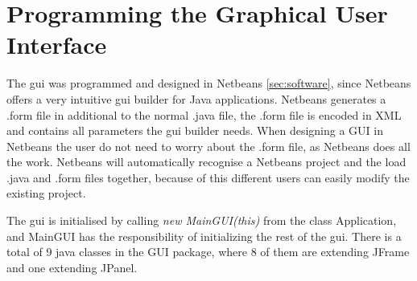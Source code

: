 \section{Programming the Graphical User Interface}
The \acrshort{gui} was programmed and designed in Netbeans \ref{sec:software}, since Netbeans offers a very intuitive \acrshort{gui} builder for Java applications. Netbeans generates a .form file in additional to the normal .java file, the .form file is encoded in XML and contains all parameters the \acrshort{gui} builder needs. When designing a GUI in Netbeans the user do not need to worry about the .form file, as Netbeans does all the work. Netbeans will automatically recognise a Netbeans project and the load .java and .form files together, because of this different users can easily modify the existing project.

The \acrshort{gui} is initialised by calling \textit{new MainGUI(this)} from the class Application, and MainGUI has the responsibility of initializing the rest of the \acrshort{gui}. There is a total of 9 java classes in the GUI package, where 8 of them are extending JFrame and one extending JPanel.